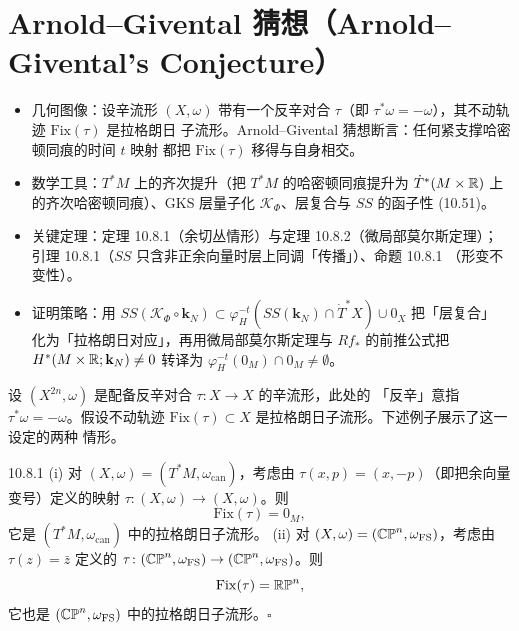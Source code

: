 
\section{Arnold--Givental 猜想（Arnold--Givental's Conjecture）}

\begin{keytakeaways}
\begin{itemize}
  \item 几何图像：设辛流形 $(X,\omega)$ 带有一个反辛对合 $\tau$（即
        $\tau^*\omega=-\omega$），其不动轨迹 $\mathrm{Fix}(\tau)$ 是拉格朗日
        子流形。Arnold--Givental 猜想断言：任何紧支撑哈密顿同痕的时间 $t$ 映射
        都把 $\mathrm{Fix}(\tau)$ 移得与自身相交。
  \item 数学工具：$T^*M$ 上的齐次提升（把 $T^*M$ 的哈密顿同痕提升为
        $\dot T^*(M\times\mathbb{R})$ 上的齐次哈密顿同痕）、GKS 层量子化
        $\mathcal K_\Phi$、层复合与 $SS$ 的函子性 (10.51)。
  \item 关键定理：定理 10.8.1（余切丛情形）与定理 10.8.2（微局部莫尔斯定理）；
        引理 10.8.1（$SS$ 只含非正余向量时层上同调「传播」）、命题 10.8.1
        （形变不变性）。
  \item 证明策略：用 $SS(\mathcal K_\Phi\circ\mathbf{k}_N)\subset
        \varphi_H^{-t}(SS(\mathbf{k}_N)\cap\dot T^*X)\cup0_X$ 把「层复合」
        化为「拉格朗日对应」，再用微局部莫尔斯定理与 $Rf_*$ 的前推公式把
        $H^*(M\times\mathbb{R};\mathbf{k}_N)\ne0$ 转译为 $\varphi_H^{-t}(0_M)\cap0_M
        \ne\emptyset$。
\end{itemize}
\end{keytakeaways}

设 $(X^{2n},\omega)$ 是配备反辛对合 $\tau\colon X\to X$ 的辛流形，此处的
「反辛」意指 $\tau^*\omega=-\omega$。假设不动轨迹
$\mathrm{Fix}(\tau)\subset X$ 是拉格朗日子流形。下述例子展示了这一设定的两种
情形。

\begin{wexam}{10.8.1}
  (i) 对 $(X,\omega)=(T^*M,\omega_{\mathrm{can}})$，考虑由
  $\tau(x,p)=(x,-p)$（即把余向量变号）定义的映射
  $\tau\colon(X,\omega)\to(X,\omega)$。则
  \[
    \mathrm{Fix}(\tau)=0_M,
  \]
  它是 $(T^*M,\omega_{\mathrm{can}})$ 中的拉格朗日子流形。
  (ii) 对 $(X,\omega)=(\mathbb{CP}^n,\omega_{\mathrm{FS}})$，考虑由
  $\tau(z)=\bar z$ 定义的
  $\tau\colon(\mathbb{CP}^n,\omega_{\mathrm{FS}})\to(\mathbb{CP}^n,\omega_{\mathrm{FS}})$。则
  \[
    \mathrm{Fix}(\tau)=\mathbb{RP}^n,
  \]
  它也是 $(\mathbb{CP}^n,\omega_{\mathrm{FS}})$ 中的拉格朗日子流形。\hfill$\square$
\end{wexam}

